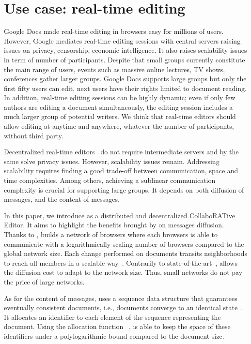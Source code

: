 
\section{Use case: real-time editing}
\label{sec:proposal2}

Google Docs made real-time editing in browsers easy for millions of
users. However, Google mediates real-time editing sessions with central servers
raising issues on privacy, censorship, economic intelligence. It also raises
scalability issues in term of number of participants.  Despite that small groups
currently constitute the main range of users, events such as massive online
lectures, TV shows, conferences gather larger groups.  Google Docs supports
large groups but only the first fifty users can edit, next users have their
rights limited to document reading. In addition, real-time editing sessions can
be highly dynamic; even if only few authors are editing a document
simultaneously, the editing session includes a much larger group of potential
writers. We think that real-time editors should allow editing at anytime and
anywhere, whatever the number of participants, without third party.

Decentralized real-time editors~\cite{oster2006data, sun1998operational,
  sun2009contextbased} do not require intermediate servers and by the same solve
privacy issues. However, scalability issues remain.  Addressing scalability
requires finding a good trade-off between communication, space and time
complexities. Among others, achieving a sublinear communication complexity is
crucial for supporting large groups.  It depends on both diffusion of messages,
and the content of messages.

In this paper, we introduce \CRATE as a distributed and decentralized
CollaboRATive Editor. It aims to highlight the benefits brought by \SPRAY on
messages diffusion. Thanks to \SPRAY, \CRATE builds a network of browsers where
each browsers is able to communicate with a logarithmically scaling number of
browsers compared to the global network size. Each change performed on documents
transits neighborhoods to reach all members in a scalable
way~\cite{birman1999bimodal}. Contrarily to
state-of-the-art~\cite{tolgyeski2009adaptive, voulgaris2005cyclon}, \SPRAY
allows the diffusion cost to adapt to the network size. Thus, small networks do
not pay the price of large networks.

As for the content of messages, \CRATE uses a sequence data structure
that guarantees eventually consistent documents, i.e., documents converge to an
identical state~\cite{bailis2013eventual}. It allocates an identifier to each
element of the sequence representing the document. Using the allocation function
\LSEQ~\cite{nedelec2013lseq}, \CRATE is able to keep the space of these
identifiers under a polylogarithmic bound compared to the document size.

